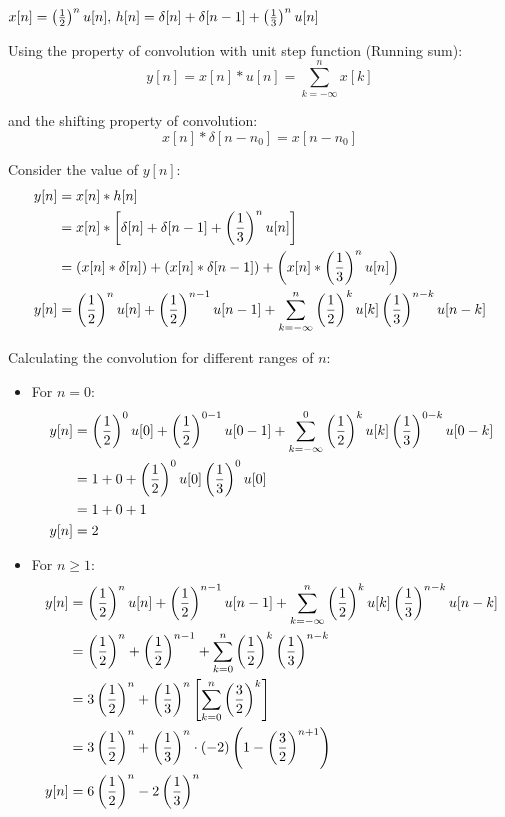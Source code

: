 \documentclass[a4paper, 10pt]{article}
\begin{document}
\begin{tosubmit}    
\begin{subproblems}[start=3]
    \item \( x[n] = \left( \frac{1}{2} \right)^n u[n],\, h[n] = \delta[n] +\delta[n-1] +  \left( \frac{1}{3} \right)^n u[n] \)
\end{subproblems}

\par\noindent\submitsolution
Using the property of convolution with unit step function (Running sum):
\[ y[n] = x[n] * u[n] = \sum_{k=-\infty}^{n} x[k] \]

and the shifting property of convolution:
\[ x[n] * \delta[n - n_0] = x[n - n_0] \]

Consider the value of \( y[n] \):
\begin{align*}
    y[n] &= x[n] * h[n] \\
    &= x[n] * \left[ \delta[n] + \delta[n - 1] + \left( \frac{1}{3} \right)^n u[n] \right] \\
    &= \left( x[n] * \delta[n] \right) + \left( x[n] * \delta[n - 1] \right) + \left( x[n] * \left( \frac{1}{3} \right)^n u[n] \right) \\
    y[n] &= \left( \frac{1}{2} \right)^n u[n] + \left( \frac{1}{2} \right)^{n - 1} u[n - 1] + \sum_{k=-\infty}^{n} \left( \frac{1}{2} \right)^k u[k] \left( \frac{1}{3} \right)^{n - k} u[n - k]
\end{align*}

Calculating the convolution for different ranges of \( n \):
\begin{itemize}
    \item For \( n = 0 \):
    \begin{align*}
        y[n] &= \left( \frac{1}{2} \right)^0 u[0] + \left( \frac{1}{2} \right)^{0 - 1} u[0 - 1] + \sum_{k=-\infty}^{0} \left( \frac{1}{2} \right)^k u[k] \left( \frac{1}{3} \right)^{0 - k} u[0 - k] \\
        &= 1 + 0 + \left( \frac{1}{2} \right)^0 u[0] \left( \frac{1}{3} \right)^{0} u[0] \\
        &= 1 + 0 + 1 \\
        y[n] &= 2
    \end{align*}

    \item For \( n \geq 1 \):
    \begin{align*}
        y[n] &= \left( \frac{1}{2} \right)^n u[n] + \left( \frac{1}{2} \right)^{n - 1} u[n - 1] + \sum_{k=-\infty}^{n} \left( \frac{1}{2} \right)^k u[k] \left( \frac{1}{3} \right)^{n - k} u[n - k] \\
        &= \left( \frac{1}{2} \right)^n + \left( \frac{1}{2} \right)^{n - 1} + \sum_{k=0}^{n} \left( \frac{1}{2} \right)^k \left( \frac{1}{3} \right)^{n - k} \\
        &= 3 \left( \frac{1}{2} \right)^n + \left( \frac{1}{3} \right)^{n} \left[ \sum_{k=0}^{n} \left( \frac{3}{2} \right)^k \right] \\
        &= 3 \left( \frac{1}{2} \right)^n + \left( \frac{1}{3} \right)^{n} \cdot (-2)\left(1 - \left( \frac{3}{2} \right)^{n+1}\right) \\
        y[n] &= 6 \left( \frac{1}{2} \right)^n - 2 \left( \frac{1}{3} \right)^{n}
    \end{align*}
\end{itemize}


\end{tosubmit}
\end{document}
